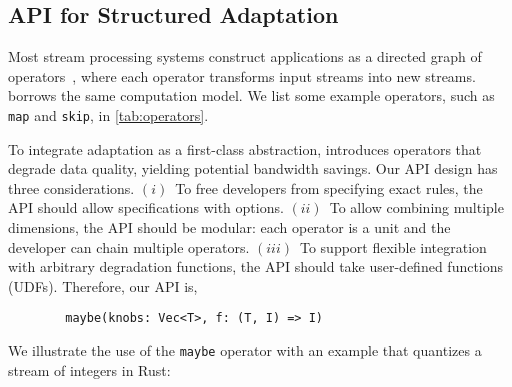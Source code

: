 \subsection{API for Structured Adaptation}
\label{sec:structure-adapt}

Most stream processing systems construct applications as a directed graph of
operators~\cite{toshniwal2014storm, zaharia2013discretized}, where each operator
transforms input streams into new streams. \sysname{} borrows the same
computation model. We list some example operators, such as \texttt{map} and
\texttt{skip}, in \autoref{tab:operators}.

To integrate adaptation as a first-class abstraction, \sysname{} introduces
\maybe{} operators that degrade data quality, yielding potential bandwidth
savings.  Our API design has three considerations.  $(i)$~To free developers
from specifying exact rules, the API should allow specifications with
options. $(ii)$~To allow combining multiple dimensions, the API should be
modular: each operator is a unit and the developer can chain multiple
operators. $(iii)$~To support flexible integration with arbitrary degradation
functions, the API should take user-defined functions (UDFs). Therefore, our API
is,

\vspace{-2pt}
\begin{lstlisting}
        maybe(knobs: Vec<T>, f: (T, I) => I)
\end{lstlisting}

We illustrate the use of the \texttt{maybe} operator with an example that
quantizes a stream of integers in Rust:

